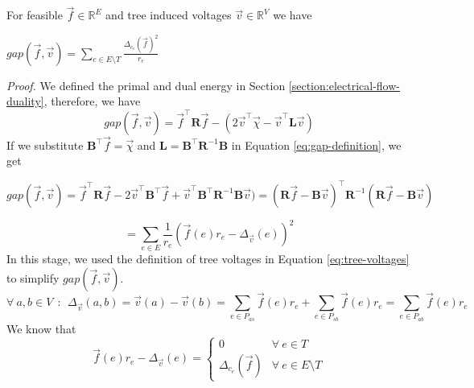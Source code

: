 \begin{lemma}
    \label{lemma:tree-gap}
    For feasible $\overrightarrow{f} \in \mathds{R}^E$ and tree induced voltages $\overrightarrow{v} \in \mathds{R}^V$ we have
    \begin{center}
        $gap(\overrightarrow{f},\overrightarrow{v})=\sum_{e \in E \setminus T} \frac{\Delta_{c_e}(\overrightarrow{f})^2}{r_e}$
    \end{center}
\end{lemma}
\textit{Proof.} We defined the primal and dual energy in Section \ref{section:electrical-flow-duality}, therefore, we have
\begin{equation}
    \label{eq:gap-definition}
    gap(\overrightarrow{f},\overrightarrow{v})=\overrightarrow{f}^\top \mathbf{R} \overrightarrow{f} - (2 \overrightarrow{v}^\top \overrightarrow{\chi} - \overrightarrow{v}^\top \mathbf{L} \overrightarrow{v})
\end{equation}
If we substitute $\mathbf{B}^\top \overrightarrow{f} = \overrightarrow{\chi}$ and $\mathbf{L}=\mathbf{B}^\top \mathbf{R}^{-1} \mathbf{B}$ in Equation \ref{eq:gap-definition}, we get
\begin{center}
    $gap(\overrightarrow{f},\overrightarrow{v})=\overrightarrow{f}^\top \mathbf{R} \overrightarrow{f} - 2 \overrightarrow{v}^\top \mathbf{B}^\top \overrightarrow{f} + \overrightarrow{v}^\top \mathbf{B}^\top \mathbf{R}^{-1} \mathbf{B} \overrightarrow{v})=(\mathbf{R}\overrightarrow{f}-\mathbf{B}\overrightarrow{v})^\top \mathbf{R}^{-1} (\mathbf{R}\overrightarrow{f}-\mathbf{B}\overrightarrow{v})$
\end{center}
\begin{equation}
    =\sum_{e \in E } \frac{1}{r_e}(\overrightarrow{f}(e)r_e - \Delta_{\overrightarrow{v}}(e))^2
\end{equation}
In this stage, we used the definition of tree voltages in Equation \ref{eq:tree-voltages} to simplify $gap(\overrightarrow{f}, \overrightarrow{v})$.
\begin{equation}
    \label{eq:tree-voltages}
    \forall~ a,b \in V ~~:~~ \Delta_{\overrightarrow{v}}(a,b)=\overrightarrow{v}(a) - \overrightarrow{v} (b) = \sum_{e \in P_{as}} \overrightarrow{f}(e) r_e + \sum_{e \in P_{sb}} \overrightarrow{f}(e) r_e = \sum_{e \in P_{ab}} \overrightarrow{f}(e) r_e
\end{equation}
We know that 
\begin{equation}
    \label{eq:tree-voltages-cases}
    \overrightarrow{f}(e) r_e - \Delta_{\overrightarrow{v}}(e) = \begin{cases}
        0 &  \forall ~ e \in T \\
        \Delta_{c_e}(\overrightarrow{f})  &  \forall ~ e \in E \setminus T 
\end{cases}
\end{equation}
